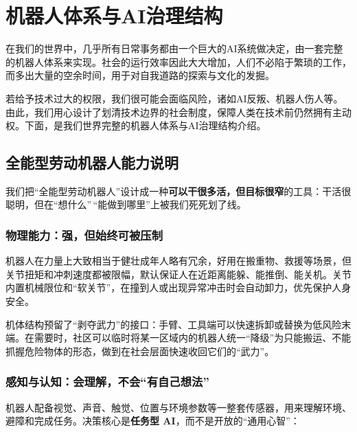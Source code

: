 ﻿\chapter{机器人体系与AI治理结构}\label{ux673aux5668ux4ebaux4f53ux7cfbux4e0eaiux6cbbux7406ux7ed3ux6784}

在我们的世界中，几乎所有日常事务都由一个巨大的AI系统做决定，由一套完整的机器人体系来实现。社会的运行效率因此大大增加，人们不必陷于繁琐的工作，而多出大量的空余时间，用于对自我道路的探索与文化的发掘。

若给予技术过大的权限，我们很可能会面临风险，诸如AI反叛、机器人伤人等。由此，我们用心设计了划清技术边界的社会制度，保障人类在技术前仍然拥有主动权。下面，是我们世界完整的机器人体系与AI治理结构介绍。

\section{全能型劳动机器人能力说明}\label{ux5168ux80fdux578bux52b3ux52a8ux673aux5668ux4ebaux80fdux529bux8bf4ux660e}

我们把``全能型劳动机器人''设计成一种\textbf{可以干很多活，但目标很窄}的工具：干活很聪明，但在``想什么''\,``能做到哪里''上被我们死死划了线。

\subsection{物理能力：强，但始终可被压制}\label{ux7269ux7406ux80fdux529bux5f3aux4f46ux59cbux7ec8ux53efux88abux538bux5236}

机器人在力量上大致相当于健壮成年人略有冗余，好用在搬重物、救援等场景，但关节扭矩和冲刺速度都被限幅，默认保证人在近距离能躲、能推倒、能关机。关节内置机械限位和``软关节''，在撞到人或出现异常冲击时会自动卸力，优先保护人身安全。

机体结构预留了``剥夺武力''的接口：手臂、工具端可以快速拆卸或替换为低风险末端。在需要时，社区可以临时将某一区域内的机器人统一``降级''为只能搬运、不能抓握危险物体的形态，做到在社会层面快速收回它们的``武力''。

\subsection{感知与认知：会理解，不会``有自己想法''}\label{ux611fux77e5ux4e0eux8ba4ux77e5ux4f1aux7406ux89e3ux4e0dux4f1aux6709ux81eaux5df1ux60f3ux6cd5}

机器人配备视觉、声音、触觉、位置与环境参数等一整套传感器，用来理解环境、避障和完成任务。决策核心是\textbf{任务型 AI}，而不是开放的``通用心智''：

